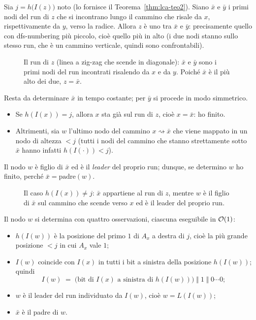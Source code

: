 \begin{dimostrazione*}
  Sia $j=h\bigl(I(z)\bigr)$ noto (lo fornisce il Teorema~\ref{thm:lca-teo2}). Siano
  $\bar x$ e $\bar y$ i primi nodi del run di $z$ che si incontrano lungo il cammino
  che risale da $x$, rispettivamente da $y$, verso la radice. Allora $z$ è uno tra
  $\bar x$ e $\bar y$: precisamente quello con dfs-numbering più piccolo, cioè quello
  più in alto (i due nodi stanno sullo stesso run, che è un cammino verticale, quindi
  sono confrontabili).

  \begin{figure}[H]
    \centering
    
    \caption{Il run di $z$ (linea a zig-zag che scende in diagonale): $\bar x$ e
      $\bar y$ sono i primi nodi del run incontrati risalendo da $x$ e da $y$. Poiché
      $\bar x$ è il più alto dei due, $z=\bar x$.}
    \label{fig:lca-run-xbar-ybar}
  \end{figure}


  Resta da determinare $\bar x$ in tempo costante; per $\bar y$ si procede in modo
  simmetrico.
  \begin{itemize}
    \item Se $h(I(x))=j$, allora $x$ sta già sul run di $z$, cioè $x=\bar x$: ho
          finito.
    \item Altrimenti, sia $w$ l'ultimo nodo del cammino $x\rightsquigarrow\bar x$ che
          viene mappato in un nodo di altezza $<j$ (tutti i nodi del cammino che stanno
          strettamente sotto $\bar x$ hanno infatti $h(I(\cdot))<j$).
  \end{itemize}

  Il nodo $w$ è figlio di $\bar x$ ed è il \emph{leader} del proprio run; dunque, se
  determino $w$ ho finito, perché $\bar x=\mathrm{padre}(w)$.

  \begin{figure}[H]
    \centering
    
    \caption{Il caso $h(I(x))\neq j$: $\bar x$ appartiene al run di $z$, mentre $w$ è
      il figlio di $\bar x$ sul cammino che scende verso $x$ ed è il leader del proprio
      run.}
    \label{fig:lca-xbar-w}
  \end{figure}

  Il nodo $w$ si determina con quattro osservazioni, ciascuna eseguibile in $\mathcal{O}(1)$:
  \begin{itemize}
    \item $h(I(w))$ è la posizione del primo $1$ di $A_x$ a destra di $j$, cioè la più
          grande posizione $<j$ in cui $A_x$ vale $1$;
    \item $I(w)$ coincide con $I(x)$ in tutti i bit a sinistra della posizione
          $h(I(w))$; quindi
          \[
            I(w)\;=\;\bigl(\text{bit di } I(x) \text{ a sinistra di } h(I(w))\bigr)
            \;\Vert\;1\;\Vert\;0\cdots0 ;
          \]
    \item $w$ è il leader del run individuato da $I(w)$, cioè $w=L(I(w))$;
    \item $\bar x$ è il padre di $w$.
  \end{itemize}
\end{dimostrazione*}

